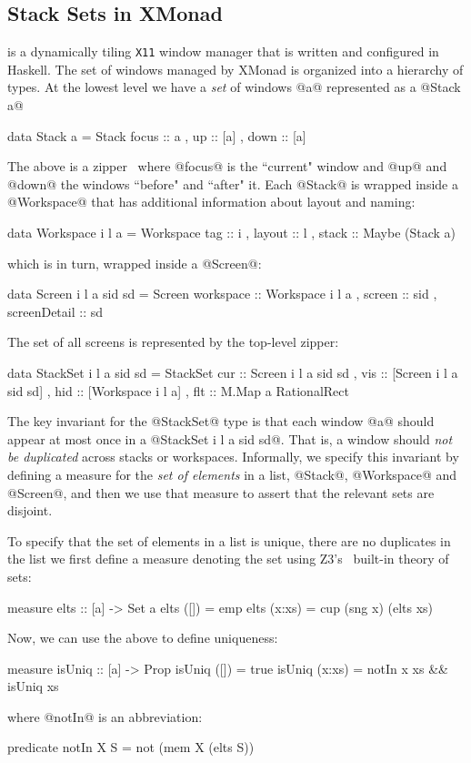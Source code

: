 \subsection{Stack Sets in XMonad}\label{sec:xmonad}

\lbxmonad is a dynamically tiling \texttt{X11} 
window manager that is written and configured in Haskell. 
The set of windows managed by XMonad is organized into a
hierarchy of types. At the lowest level we have a 
\emph{set} of windows @a@ represented as a @Stack a@
%
\begin{code}
  data Stack a = Stack { focus :: a   
                       , up    :: [a] 
                       , down  :: [a] }
\end{code}
%
The above is a zipper~\cite{zipper} where @focus@ is the 
``current" window and @up@ and @down@ the windows ``before"
and ``after" it.
%
Each \hbox{@Stack@} is wrapped inside a @Workspace@ that has
additional information about layout and naming:
%
\begin{code}
  data Workspace i l a = Workspace 
     { tag    :: i
     , layout :: l
     , stack  :: Maybe (Stack a) }
\end{code}
%
which is in turn, wrapped inside a @Screen@:
%
\begin{code}
  data Screen i l a sid sd = Screen 
    { workspace    :: Workspace i l a
    , screen       :: sid
    , screenDetail :: sd }
\end{code}
%
The set of all screens is represented by the top-level zipper:
%
\begin{code}
  data StackSet i l a sid sd = StackSet 
    { cur :: Screen i l a sid sd  
    , vis :: [Screen i l a sid sd]
    , hid :: [Workspace i l a]   
    , flt :: M.Map a RationalRect } 
\end{code}


The key invariant for the @StackSet@ type is that each window @a@
should appear at most once in a @StackSet i l a sid sd@. That is,
a window should \emph{not be duplicated} across stacks or workspaces.
Informally, we specify this invariant by defining a measure for the 
\emph{set of elements} in a list, @Stack@, @Workspace@ and @Screen@,
and then we use that measure to assert that the relevant sets are 
disjoint.

 To specify that the set of elements
in a list is unique, \ie there are no duplicates in the list we first define
a measure denoting the set using Z3's~\citep{z3} built-in theory of sets:
%
\begin{code}
  measure elts :: [a] -> Set a 
  elts ([])   = emp  
  elts (x:xs) = cup (sng x) (elts xs) 
\end{code}
%
Now, we can use the above to define uniqueness:
%
\begin{code}
  measure isUniq :: [a] -> Prop 
  isUniq ([])   =  true 
  isUniq (x:xs) =  notIn x xs && isUniq xs
\end{code}
%
where @notIn@ is an abbreviation: 
%
\begin{code}
  predicate notIn X S = not (mem X (elts S))
\end{code}

